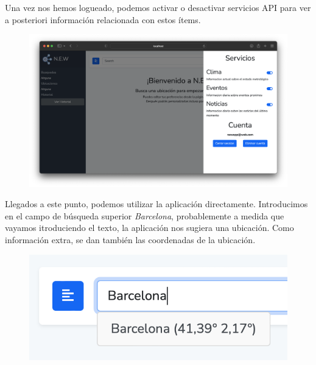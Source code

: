 \documentclass[../ei103948-project-documentation.tex]{subfiles}
\begin{document}
                                Una vez nos hemos logueado, podemos activar o desactivar servicios API para ver a posteriori información relacionada con estos ítems.



                                \begin{figure}[H]
                                    \begin{center}
                                        \hspace*{-7mm}
                                    \includegraphics[scale=0.342]{images/final3.png}
                                    \end{center}
                                \end{figure}

                                Llegados a este punto, podemos utilizar la aplicación directamente. Introducimos en el campo de búsqueda superior \textit{Barcelona}, probablemente a medida que vayamos itroduciendo el texto, la aplicación nos sugiera una ubicación. Como información extra, se dan también las coordenadas de la ubicación.\\


                                \begin{figure}[H]
                                    \begin{center}
                                    \includegraphics[scale=0.50]{images/finaltextoautocompletado.png}
                                    \end{center}
                                \end{figure}
\end{document}
